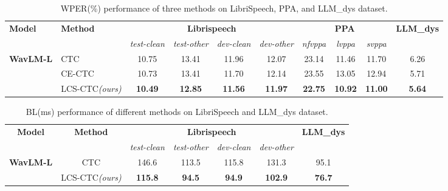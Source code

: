 \begin{table}[ht]
\centering
\begin{tabular}{l|l|cccc|ccc|c}
\toprule
\multirow{2}{*}{\textbf{Model}} & \multirow{2}{*}{\textbf{Method}} & \multicolumn{4}{c|}{\textbf{Librispeech}} & \multicolumn{3}{c|}{\textbf{PPA}} & \multirow{2}{*}{\textbf{LLM\_dys}} \\
 & & \textit{test-clean} & \textit{test-other} & \textit{dev-clean} & \textit{dev-other} & \textit{nfvppa} & \textit{lvppa} & \textit{svppa} & \\
\midrule
\multirow{3}{*}{\textbf{WavLM-L}} 
 & CTC & 10.75 & 13.41 & 11.96 & 12.07 & 23.14 & 11.46 & 11.70 & 6.26 \\
 & CE-CTC & 10.73 & 13.41 & 11.70 & 12.14 & 23.55 & 13.05 & 12.94 & 5.71 \\
 & LCS-CTC\textit{(ours)} & \textbf{10.49} & \textbf{12.85} & \textbf{11.56} & \textbf{11.97} & \textbf{22.75} & \textbf{10.92} & \textbf{11.00} & \textbf{5.64} \\
\bottomrule
\end{tabular}
\caption{WPER(\%) performance of three methods on LibriSpeech, PPA, and LLM\_dys dataset.}
\label{tab:wper-results}
 \vspace{-5pt}
\end{table}

\begin{table}[ht]
\centering
\begin{tabular}{c|c|cccc|c}
\toprule
\multirow{2}{*}{\textbf{Model}} & \multirow{2}{*}{\textbf{Method}} 
& \multicolumn{4}{c|}{\textbf{Librispeech}} & \multirow{2}{*}{\textbf{LLM\_dys}} \\
& & \textit{test-clean} & \textit{test-other} & \textit{dev-clean} & \textit{dev-other} & \\
\midrule
\multirow{2}{*}{\textbf{WavLM-L}} 
& CTC      & 146.6 & 113.5 & 115.8 & 131.3 & 95.1 \\
& LCS-CTC\textit{(ours)}  & \textbf{115.8} & \textbf{94.5} & \textbf{94.9} & \textbf{102.9} & \textbf{76.7} \\
\bottomrule
\end{tabular}
\caption{BL(ms) performance of different methods on LibriSpeech and LLM\_dys dataset.}
\label{tab:boundary-loss}
 \vspace{-5pt}
\end{table}

